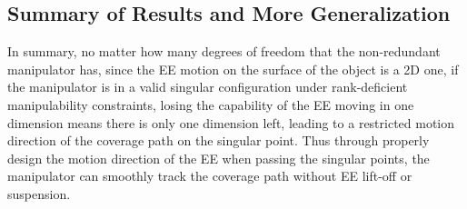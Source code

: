 \documentclass[Afour,sageh,times]{sagej}
\begin{document}




\subsection{Summary of Results and More Generalization}
In summary, no matter how many degrees of freedom that the non-redundant manipulator has, since the EE motion on the surface of the object is a 2D one, if the manipulator is in a valid singular configuration under rank-deficient manipulability constraints, losing the capability of the EE moving in one dimension means there is only one dimension left, leading to a restricted motion direction of the coverage path on the singular point. Thus through properly design the motion direction of the EE when passing the singular points, the manipulator can smoothly track the coverage path without EE lift-off or suspension. 

\end{document}

